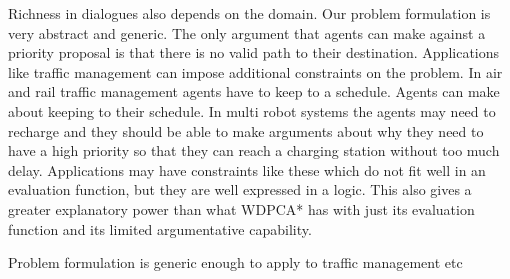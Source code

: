 Richness in dialogues also depends on the domain. Our problem formulation is
very abstract and generic. The only argument that agents can make against a
priority proposal is that there is no valid path to their destination.
Applications like traffic management can impose additional constraints on the
problem. In air and rail traffic management agents have to keep to a schedule.
Agents can make about keeping to their schedule. In multi robot systems the
agents may need to recharge and they should be able to make arguments about why
they need to have a high priority so that they can reach a charging station
without too much delay. Applications may have constraints like these which do
not fit well in an evaluation function, but they are well expressed in a logic.
This also gives a greater explanatory power than what WDPCA* has with just its
evaluation function and its limited argumentative capability.



Problem formulation is generic enough to apply to traffic management etc

